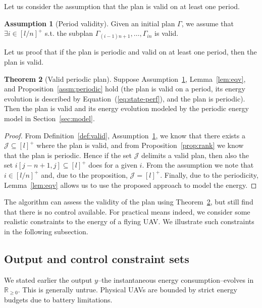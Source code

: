 \documentclass[letterpaper,10pt,conference]{ieeeconf}
\theoremstyle{definition}
\newtheorem{thm}{Theorem}[section]
\newtheorem{assm}[thm]{Assumption}
\begin{document}
Let us consider the assumption that the plan is valid on at least one period.

\begin{assm}[Period validity]\label{assm:valid}
  Given an initial plan $\Gamma$, we assume that $\exists i\in[l/n]^+$ s.t. the subplan $\Gamma_{(i-1)n+1},\dots,\Gamma_{in}$ is valid.
\end{assm}

Let us proof that if the plan is periodic and valid on at least one period, then the plan is valid.

\begin{thm}[Valid periodic plan]\label{thm:state-vs-energy}  
  Suppose Assumption~\ref{assm:valid}, Lemma~\ref{lem:eqv}, and Proposition~\ref{assm:periodic} hold (the plan is valid on a period, its energy evolution is described by Equation~(\ref{eq:state-perf}), and the plan is periodic). Then the plan is valid and its energy evolution modeled by the periodic energy model in Section~\ref{sec:model}.
\end{thm}
\begin{proof}
  From Definition~\ref{def:valid}, Assumption~\ref{assm:valid}, we know that there exists a $\mathcal{J}\subseteq[l]^+$ where the plan is valid, and from Proposition~\ref{prop:rank} we know that the plan is periodic. Hence if the set $\mathcal{J}$ delimits a valid plan, then also the set $i[j-n+1,j]\subseteq[l]^+$ does for a given $i$. From the assumption we note that $i\in[l/n]^+$ and, due to the proposition, $\mathcal{J}=[l]^+$. Finally, due to the periodicity, Lemma~\ref{lem:eqv} allows us to use the proposed approach to model the energy.
\end{proof}

The algorithm can assess the validity of the plan using Theorem~\ref{thm:state-vs-energy}, but still find that there is no control available. 
For practical means indeed, we consider some realistic constraints to the energy of a flying UAV. We illustrate such constraints in the following subsection.

\subsection{Output and control constraint sets}

We stated earlier the output $y$--the instantaneous energy consumption--evolves in $\mathbb{R}_{\geq 0}$. This is generally untrue. Physical UAVs are bounded by strict energy budgets due to battery limitations.
\end{document}
